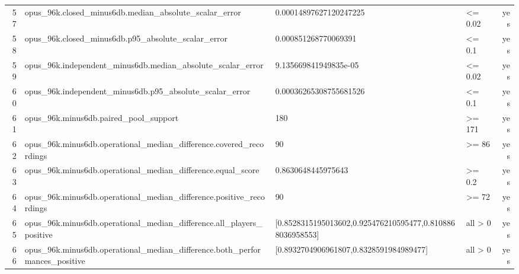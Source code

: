 \documentclass{article}
\begin{document}
\begin{longtable}{r p{5cm} p{4cm} p{2.5cm} r}
57 & opus\_\allowbreak{}96k.\allowbreak{}closed\_\allowbreak{}minus6db.\allowbreak{}median\_\allowbreak{}absolute\_\allowbreak{}scalar\_\allowbreak{}error & 0.\allowbreak{}00014897627120247225 & <= 0.\allowbreak{}02 & yes \\
58 & opus\_\allowbreak{}96k.\allowbreak{}closed\_\allowbreak{}minus6db.\allowbreak{}p95\_\allowbreak{}absolute\_\allowbreak{}scalar\_\allowbreak{}error & 0.\allowbreak{}000851268770069391 & <= 0.\allowbreak{}1 & yes \\
59 & opus\_\allowbreak{}96k.\allowbreak{}independent\_\allowbreak{}minus6db.\allowbreak{}median\_\allowbreak{}absolute\_\allowbreak{}scalar\_\allowbreak{}error & 9.\allowbreak{}135669841949835e-05 & <= 0.\allowbreak{}02 & yes \\
60 & opus\_\allowbreak{}96k.\allowbreak{}independent\_\allowbreak{}minus6db.\allowbreak{}p95\_\allowbreak{}absolute\_\allowbreak{}scalar\_\allowbreak{}error & 0.\allowbreak{}00036265308755681526 & <= 0.\allowbreak{}1 & yes \\
61 & opus\_\allowbreak{}96k.\allowbreak{}minus6db.\allowbreak{}paired\_\allowbreak{}pool\_\allowbreak{}support & 180 & >= 171 & yes \\
62 & opus\_\allowbreak{}96k.\allowbreak{}minus6db.\allowbreak{}operational\_\allowbreak{}median\_\allowbreak{}difference.\allowbreak{}covered\_\allowbreak{}recordings & 90 & >= 86 & yes \\
63 & opus\_\allowbreak{}96k.\allowbreak{}minus6db.\allowbreak{}operational\_\allowbreak{}median\_\allowbreak{}difference.\allowbreak{}equal\_\allowbreak{}score & 0.\allowbreak{}8630648445975643 & >= 0.\allowbreak{}2 & yes \\
64 & opus\_\allowbreak{}96k.\allowbreak{}minus6db.\allowbreak{}operational\_\allowbreak{}median\_\allowbreak{}difference.\allowbreak{}positive\_\allowbreak{}recordings & 90 & >= 72 & yes \\
65 & opus\_\allowbreak{}96k.\allowbreak{}minus6db.\allowbreak{}operational\_\allowbreak{}median\_\allowbreak{}difference.\allowbreak{}all\_\allowbreak{}players\_\allowbreak{}positive & [0.\allowbreak{}8528315195013602,\allowbreak{}0.\allowbreak{}925476210595477,\allowbreak{}0.\allowbreak{}8108868036958553] & all > 0 & yes \\
66 & opus\_\allowbreak{}96k.\allowbreak{}minus6db.\allowbreak{}operational\_\allowbreak{}median\_\allowbreak{}difference.\allowbreak{}both\_\allowbreak{}performances\_\allowbreak{}positive & [0.\allowbreak{}8932704906961807,\allowbreak{}0.\allowbreak{}8328591984989477] & all > 0 & yes \\

\end{longtable}
\end{document}
